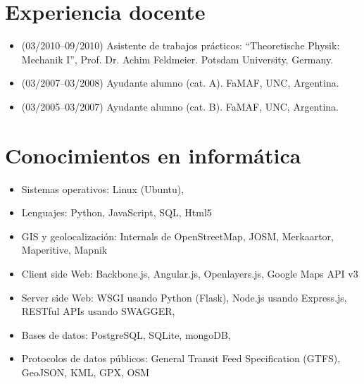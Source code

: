 \documentclass[a4paper]{article}
\begin{document}
\section{Experiencia docente}
\begin{itemize}
 \item(03/2010--09/2010) Asistente de trabajos prácticos: ``Theoretische
Physik: Mechanik I'', Prof. Dr. Achim Feldmeier. Potsdam University, Germany.
 \item(03/2007--03/2008) Ayudante alumno (cat. A). FaMAF, UNC, Argentina.
 \item(03/2005--03/2007) Ayudante alumno (cat. B). FaMAF, UNC, Argentina.
\end{itemize}

\section{Conocimientos en informática}
\begin{itemize}
 \item Sistemas operativos: Linux (Ubuntu),
 \item Lenguajes: Python, JavaScript, SQL, Html5
 \item GIS y geolocalización: Internals de OpenStreetMap, JOSM, Merkaartor,
Maperitive, Mapnik
 \item Client side Web: Backbone.js, Angular.js, Openlayers.js, Google Maps API 
v3
 \item Server side Web: WSGI usando Python (Flask), Node.js usando Express.js, 
RESTful APIs usando SWAGGER,
 \item Bases de datos: PostgreSQL, SQLite, mongoDB,
 \item Protocolos de datos públicos: General Transit Feed Specification (GTFS), 
GeoJSON, KML, GPX, OSM
\end{itemize}
\end{document}
